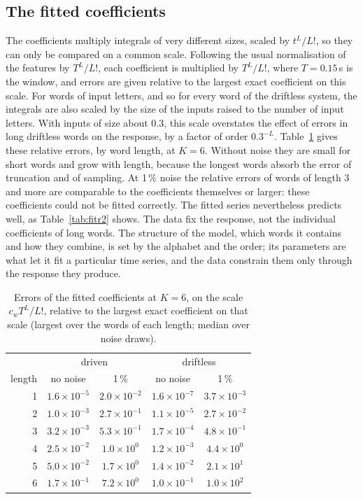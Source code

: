 \documentclass[11pt,a4paper]{article}
\theoremstyle{remark}
\begin{document}
\subsection{The fitted coefficients}
The coefficients multiply integrals of very different sizes, scaled by $t^L/L!$, so they can only be compared on a common scale.
Following the usual normalisation of the features by $T^L/L!$, each coefficient is multiplied by $T^L/L!$, where $T=0.15$\,s is the window, and errors are given relative to the largest exact coefficient on this scale.
For words of input letters, and so for every word of the driftless system, the integrals are also scaled by the size of the inputs raised to the number of input letters.
With inputs of size about 0.3, this scale overstates the effect of errors in long driftless words on the response, by a factor of order $0.3^{-L}$.
Table~\ref{tab:coefrel} gives these relative errors, by word length, at $K=6$.
Without noise they are small for short words and grow with length, because the longest words absorb the error of truncation and of sampling.
At 1\,\% noise the relative errors of words of length 3 and more are comparable to the coefficients themselves or larger: these coefficients could not be fitted correctly.
The fitted series nevertheless predicts well, as Table~\ref{tab:fitr2} shows.
The data fix the response, not the individual coefficients of long words.
The structure of the model, which words it contains and how they combine, is set by the alphabet and the order; its parameters are what let it fit a particular time series, and the data constrain them only through the response they produce.

\begin{table}[t]\centering\small
\caption{Errors of the fitted coefficients at $K=6$, on the scale $c_wT^L/L!$, relative to the largest exact coefficient on that scale (largest over the words of each length; median over noise draws).}\label{tab:coefrel}
\begin{tabular}{rcccc}\toprule
 & \multicolumn{2}{c}{driven} & \multicolumn{2}{c}{driftless}\\
length & no noise & 1\,\% & no noise & 1\,\%\\\midrule
1 & $1.6\times10^{-5}$ & $2.0\times10^{-2}$ & $1.6\times10^{-7}$ & $3.7\times10^{-3}$\\
2 & $1.0\times10^{-3}$ & $2.7\times10^{-1}$ & $1.1\times10^{-5}$ & $2.7\times10^{-2}$\\
3 & $3.2\times10^{-3}$ & $5.3\times10^{-1}$ & $1.7\times10^{-4}$ & $4.8\times10^{-1}$\\
4 & $2.5\times10^{-2}$ & $1.0\times10^{0}$ & $1.2\times10^{-3}$ & $4.4\times10^{0}$\\
5 & $5.0\times10^{-2}$ & $1.7\times10^{0}$ & $1.4\times10^{-2}$ & $2.1\times10^{1}$\\
6 & $1.7\times10^{-1}$ & $7.2\times10^{0}$ & $1.0\times10^{-1}$ & $1.0\times10^{2}$\\
\bottomrule\end{tabular}
\end{table}
\end{document}
